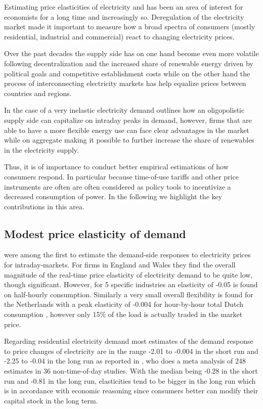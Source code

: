 \label{sec:background}
Estimating price elasticities of electricity and has been an area of interest for economists for a long time and increasingly so. Deregulation of the electricity market made it important to measure how a broad spectra of consumers (mostly residential, industrial and commercial) react to changing electricity prices.\bigskip \par
Over the past decades the supply side has on one hand become even more volatile following decentralization and the increased share of renewable energy driven by political goals and competitive establishment costs while on the other hand the process of interconnecting electricity markets has help equalize prices between countries and regions. \bigskip \par
In the case of a very inelastic electricity demand \citet{wolak2001impact} outlines how an oligopolistic supply side can capitalize on intraday peaks in demand, however, firms that are able to have a more flexible energy use can face clear advantages in the market while on aggregate making it possible to further increase the share of renewables in the electricity supply.
\par
Thus, it is of importance to conduct better empirical estimations of how consumers respond. In particular because time-of-use tariffs and other price instruments are often are often considered as policy tools to incentivize a decreased consumption of power. In the following we highlight the key contributions in this area.

\subsection{Modest price elasticity of demand}
\label{subsec:b_results}
\citet{patrick2001estimating} were among the first to estimate the demand-side responses to electricity prices for intraday-markets. For firms in England and Wales they find the overall magnitude of the real-time price elasticity of electricity demand to be quite low, though significant. However, for 5 specific industries an elasticity of -0.05 is found on half-hourly consumption. Similarly a very small overall flexibility is found for the Netherlands with a peak elasticity of -0.004 for hour-by-hour total Dutch consumption \citet{lijesen2007real}, however only 15\% of the load is actually traded in the market price. \bigskip \par
Regarding residential electricity demand most estimates of the demand response to price changes of electricity are in the range -2.01 to -0.004 in the short run and -2.25 to -0.04 in the long run as reported in \citet{espey2004turning}, who does a meta analysis of 248 estimates in 36 non-time-of-day studies. With the median being -0.28 in the short run and -0.81 in the long run, elasticities tend to be bigger in the long run which is in accordance with economic reasoning since consumers better can modify their capital stock in the long term.

